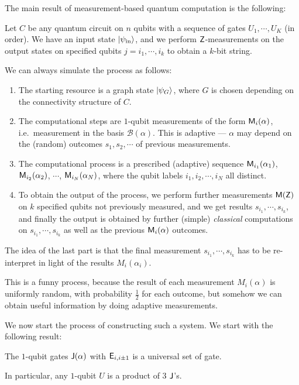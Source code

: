 The main result of measurement-based quantum computation is the following:
\begin{thm}
  Let $C$ be any quantum circuit on $n$ qubits with a sequence of gates $U_1, \cdots, U_K$ (in order). We have an input state $\left\lvert \psi_{\mathrm{in}}\right\rangle$, and we perform $\mathsf{Z}$-measurements on the output states on specified qubits $j = i_1, \cdots, i_k$ to obtain a $k$-bit string.

  We can always simulate the process as follows:
  \begin{enumerate}
    \item The starting resource is a graph state $\left\lvert \psi_G\right\rangle$, where $G$ is chosen depending on the connectivity structure of $C$.
    \item The computational steps are $1$-qubit measurements of the form $\mathsf{M}_i(\alpha)$, i.e.\ measurement in the basis $\mathcal{B}(\alpha)$. This is adaptive --- $\alpha$ may depend on the (random) outcomes $s_1, s_2, \cdots$ of previous measurements.
    \item The computational process is a prescribed (adaptive) sequence $\mathsf{M}_{i_1}(\alpha_1)$, $\mathsf{M}_{i_2}(\alpha_2)$, $\cdots$, $\mathsf{M}_{i_N}(\alpha_N)$, where the qubit labels $i_1, i_2, \cdots, i_N$ all distinct.
    \item To obtain the output of the process, we perform further measurements $\mathsf{M}(\mathsf{Z})$ on $k$ specified qubits not previously measured, and we get results $s_{i_1}, \cdots, s_{i_k}$, and finally the output is obtained by further (simple) \emph{classical} computations on $s_{i_1}, \cdots, s_{i_k}$ as well as the previous $\mathsf{M}_i(\alpha)$ outcomes.
  \end{enumerate}
\end{thm}
The idea of the last part is that the final measurement $s_{i_1}, \cdots, s_{i_k}$ has to be re-interpret in light of the results $M_i(\alpha_i)$.

This is a funny process, because the result of each measurement $M_i(\alpha)$ is uniformly random, with probability $\frac{1}{2}$ for each outcome, but somehow we can obtain useful information by doing adaptive measurements.

We now start the process of constructing such a system. We start with the following result:
\begin{fact}
  The $1$-qubit gates $\mathsf{J}(\alpha)$ with $\mathsf{E}_{i, i\pm 1}$ is a universal set of gate.

  In particular, any $1$-qubit $U$ is a product of $3$ $\mathsf{J}$'s.
\end{fact}


